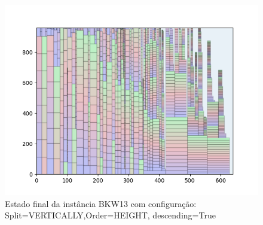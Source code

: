 \begin{figure}[H]
    \centering
    \caption[]{Estado final da instância BKW13 com configuração: Split=VERTICALLY,Order=HEIGHT, descending=True}
    \label{fig:bkw13-vertically-height-true}
    \includegraphics[scale=0.5]{output/figures/bkw/bkw13/vertically/height/true/0000}
\end{figure}